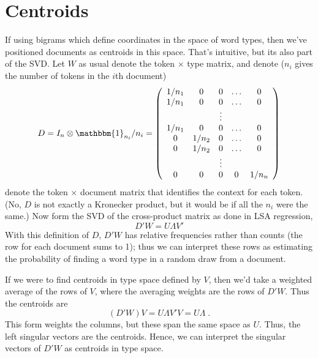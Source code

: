 \documentclass[12pt]{article}
\begin{document}
\section{ Centroids }

If using bigrams which define coordinates in the space of word types, then we've
positioned documents as centroids in this space.  That's intuitive, but its also
part of the SVD.  Let $W$ as usual denote the token $\times$ type matrix, and
denote ($n_i$ gives the number of tokens in the $i$th document) 
 \begin{equation}
     D = I_n \otimes \mathbbm{1}_{n_i}/n_i  
         = \left( \begin{array}{ccccc}
                           1/n_1 & 0 & 0 & \ldots & 0  \cr
                           1/n_1 & 0 & 0 & \ldots & 0  \cr
                              &    & \vdots     &  &  \cr
                           1/n_1 & 0 & 0 & \ldots & 0  \cr
                           0 & 1/n_2 & 0 & \ldots & 0 \cr
                           0 & 1/n_2 & 0 & \ldots & 0  \cr
                              &    & \vdots     &  &  \cr
                           0 &  0 &  0 & 0 & 1/n_n      \cr
                     \end{array}\right)                           
 \label{eq:x}
 \end{equation}
 denote the token $\times$ document matrix that identifies the context for each token. (No, $D$ is not exactly a Kronecker product, but it would be if all the $n_i$ were the same.) Now form
 the SVD of the cross-product matrix as done in LSA regression,
 \begin{displaymath}
    D'W= U \Lambda V'   
 \end{displaymath}
 With this definition of $D$, $D'W$ has relative frequencies rather than counts (the row for each document sums to 1); thus we can interpret these rows as estimating the probability of finding a word type in a random draw from a document.  
 
  If we were to find centroids in type space defined by $V$, then we'd take a weighted average
 of the rows of $V$, where the averaging weights are the rows of $D'W$.  Thus
 the centroids are
 \begin{displaymath}
    (D'W) V = U \Lambda V' V = U \Lambda \;.   
 \end{displaymath}
 This form weights the columns, but these span the same space as $U$.  Thus, the
 left singular vectors are the centroids.  Hence, we can interpret the singular
vectors of $D'W$ as centroids in type space.
\end{document}

